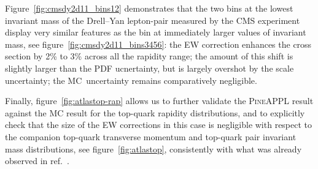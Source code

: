 Figure~\ref{fig:cmsdy2d11_bins12} demonstrates that the two bins at the
lowest invariant mass of the Drell--Yan lepton-pair measured by the CMS
experiment display very similar features as the bin at immediately larger
values of invariant mass, see figure~\ref{fig:cmsdy2d11_bins3456}: the EW
correction enhances the cross section by 2\% to 3\% across all the
rapidity range; the amount of this shift is slightly larger than the PDF
ucnertainty, but is largely overshot by the scale uncertainty; the MC\
uncertainty remains comparatively negligible.

Finally, figure~\ref{fig:atlastop-rap} allows us to further validate the
\textsc{PineAPPL} result against the MC result for the top-quark
rapidity distributions, and to explicitly check that the size of the EW
corrections in this case is negligible with respect to the companion
top-quark transverse momentum and top-quark pair invariant mass distributions,
see figure~\ref{fig:atlastop}, consistently with what was already observed in
ref.~\cite{Czakon:2017wor}.
